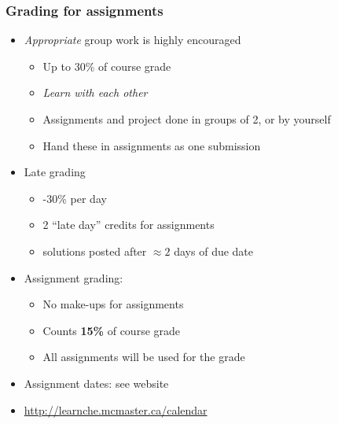 \begin{frame}\frametitle{Grading for assignments}
	\begin{itemize}
		\item	\emph{Appropriate} group work is highly encouraged 
		\begin{itemize}
			\item	Up to 30\% of course grade 
			\item	\emph{Learn with each other} 
			\item	Assignments and project done in groups of 2, or by yourself 
			\item	Hand these in assignments as one submission 
		\end{itemize}
		\item	Late grading 
		\begin{itemize}
			\item	-30\% per day 
			\item	2 ``late day'' credits for assignments 
			\item	solutions posted after $\approx 2$ days of due date 
		\end{itemize}
		\item	Assignment grading: 
		\begin{itemize}
			\item	No make-ups for assignments 
			\item	Counts \textbf{15\%} of course grade 
			\item	All assignments will be used for the grade
		\end{itemize}
		\item	Assignment dates: see website
		\item	\href{http://learnche.mcmaster.ca/calendar}{http://learnche.mcmaster.ca/calendar}
	\end{itemize}
\end{frame}

